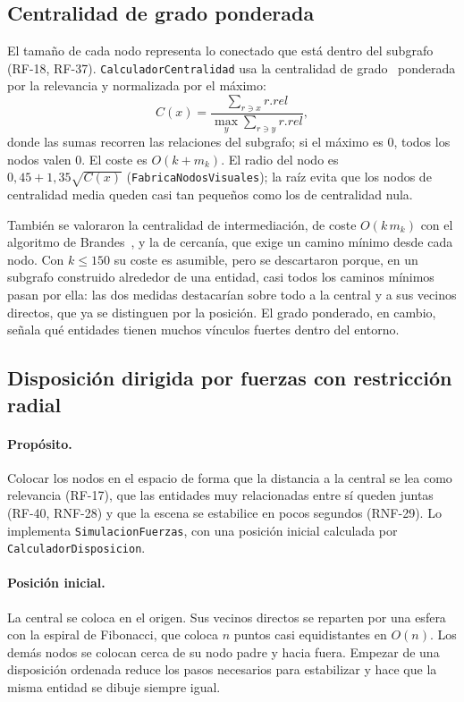 \subsection{Centralidad de grado ponderada}
\label{sec:alg-centralidad}

El tamaño de cada nodo representa lo conectado que está dentro del subgrafo (RF-18, RF-37). \texttt{CalculadorCentralidad} usa la centralidad de grado~\cite{freeman1978} ponderada por la relevancia y normalizada por el máximo:
\begin{equation}
  C(x) = \frac{\sum_{r \ni x} r.rel}{\max_{y} \sum_{r \ni y} r.rel},
\end{equation}
donde las sumas recorren las relaciones del subgrafo; si el máximo es 0, todos los nodos valen 0. El coste es $O(k + m_k)$. El radio del nodo es $0{,}45 + 1{,}35\sqrt{C(x)}$ (\texttt{FabricaNodosVisuales}); la raíz evita que los nodos de centralidad media queden casi tan pequeños como los de centralidad nula.

También se valoraron la centralidad de intermediación, de coste $O(k\,m_k)$ con el algoritmo de Brandes~\cite{brandes2001}, y la de cercanía, que exige un camino mínimo desde cada nodo. Con $k\le150$ su coste es asumible, pero se descartaron porque, en un subgrafo construido alrededor de una entidad, casi todos los caminos mínimos pasan por ella: las dos medidas destacarían sobre todo a la central y a sus vecinos directos, que ya se distinguen por la posición. El grado ponderado, en cambio, señala qué entidades tienen muchos vínculos fuertes dentro del entorno.

\subsection{Disposición dirigida por fuerzas con restricción radial}
\label{sec:alg-fuerzas}

\paragraph{Propósito.} Colocar los nodos en el espacio de forma que la distancia a la central se lea como relevancia (RF-17), que las entidades muy relacionadas entre sí queden juntas (RF-40, RNF-28) y que la escena se estabilice en pocos segundos (RNF-29). Lo implementa \texttt{SimulacionFuerzas}, con una posición inicial calculada por \texttt{CalculadorDisposicion}.

\paragraph{Posición inicial.} La central se coloca en el origen. Sus vecinos directos se reparten por una esfera con la espiral de Fibonacci, que coloca $n$ puntos casi equidistantes en $O(n)$. Los demás nodos se colocan cerca de su nodo padre y hacia fuera. Empezar de una disposición ordenada reduce los pasos necesarios para estabilizar y hace que la misma entidad se dibuje siempre igual.

